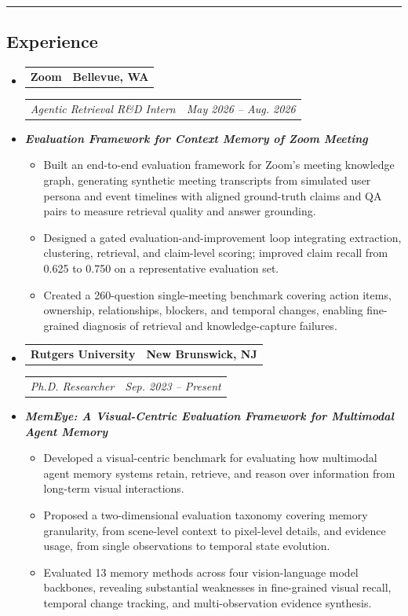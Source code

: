 \documentclass[11pt,letterpaper]{article}
\makeatletter
\newcommand{\headerrow}[2]
{\begin{tabular*}{\linewidth}{l@{\extracolsep{\fill}}r}
#1 & #2 \\
\end{tabular*}}
\makeatother
\begin{document}
\hrule
\vspace{-1em}
\subsection*{\Large Experience}

\renewcommand\labelitemi{}
\renewcommand\labelitemii{$\bullet$}
\begin{itemize}[leftmargin=1em]
    \parskip=0.1em

    \item
    \headerrow
        {\textbf{Zoom}}
        {\textbf{Bellevue, WA}}
    \headerrow
        {\emph{Agentic Retrieval R\&D Intern}}
        {\emph{May 2026 -- Aug. 2026}}

    \item \emph{\textbf{Evaluation Framework for Context Memory of Zoom Meeting}}
    \begin{itemize}[leftmargin=1.3em,itemsep=0.05em,topsep=0.15em]
        \item Built an end-to-end evaluation framework for Zoom's meeting knowledge graph, generating synthetic meeting transcripts from simulated user persona and event timelines with aligned ground-truth claims and QA pairs to measure retrieval quality and answer grounding.
        \item Designed a gated evaluation-and-improvement loop integrating extraction, clustering, retrieval, and claim-level scoring; improved claim recall from 0.625 to 0.750 on a representative evaluation set.
        \item Created a 260-question single-meeting benchmark covering action items, ownership, relationships, blockers, and temporal changes, enabling fine-grained diagnosis of retrieval and knowledge-capture failures.
    \end{itemize}

    \item
    \headerrow
        {\textbf{Rutgers University}}
        {\textbf{New Brunswick, NJ}}
    \headerrow
        {\emph{Ph.D. Researcher}}
        {\emph{Sep. 2023 -- Present}}

    \item \emph{\textbf{MemEye: A Visual-Centric Evaluation Framework for Multimodal Agent Memory}}
    \begin{itemize}[leftmargin=1.3em,itemsep=0.05em,topsep=0.15em]
        \item Developed a visual-centric benchmark for evaluating how multimodal agent memory systems retain, retrieve, and reason over information from long-term visual interactions.
        \item Proposed a two-dimensional evaluation taxonomy covering memory granularity, from scene-level context to pixel-level details, and evidence usage, from single observations to temporal state evolution.
        \item Evaluated 13 memory methods across four vision-language model backbones, revealing substantial weaknesses in fine-grained visual recall, temporal change tracking, and multi-observation evidence synthesis.
    \end{itemize}


\end{itemize}
\end{document}
